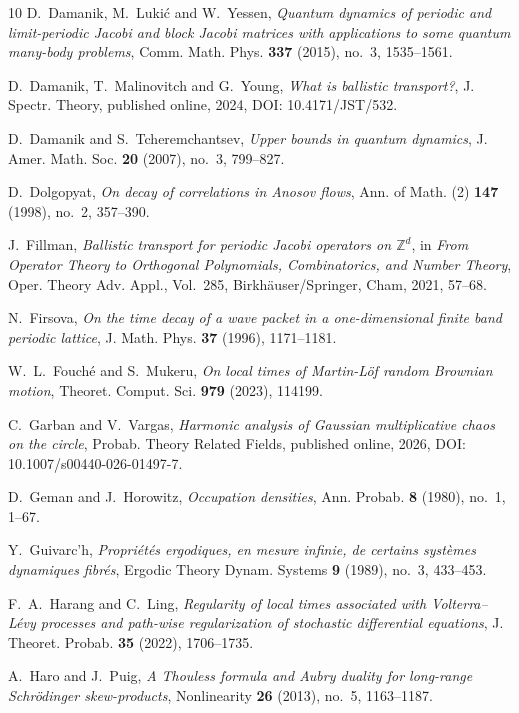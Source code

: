 \documentclass[11pt]{amsart}
\theoremstyle{plain}
\theoremstyle{definition}
\numberwithin{equation}{section}
\begin{document}
\begin{thebibliography}{10}
D.~Damanik, M.~Luki\'c and W.~Yessen,
\emph{Quantum dynamics of periodic and limit-periodic Jacobi and block Jacobi matrices with applications to some quantum many-body problems},
Comm. Math. Phys. \textbf{337} (2015), no.~3, 1535--1561.

D.~Damanik, T.~Malinovitch and G.~Young,
\emph{What is ballistic transport?},
J. Spectr. Theory, published online, 2024,
DOI: 10.4171/JST/532.

D.~Damanik and S.~Tcheremchantsev,
\emph{Upper bounds in quantum dynamics},
J. Amer. Math. Soc. \textbf{20} (2007), no.~3, 799--827.

D.~Dolgopyat,
\emph{On decay of correlations in Anosov flows},
Ann. of Math. (2) \textbf{147} (1998), no.~2, 357--390.

J.~Fillman,
\emph{Ballistic transport for periodic Jacobi operators on $\mathbb Z^d$},
in \emph{From Operator Theory to Orthogonal Polynomials, Combinatorics, and Number Theory},
Oper. Theory Adv. Appl., Vol.~285,
Birkh\"auser/Springer, Cham, 2021, 57--68.

N.~Firsova,
\emph{On the time decay of a wave packet in a one-dimensional finite band periodic lattice},
J. Math. Phys. \textbf{37} (1996), 1171--1181.

W.~L.~Fouch\'e and S.~Mukeru,
\emph{On local times of Martin-L\"of random Brownian motion},
Theoret. Comput. Sci. \textbf{979} (2023), 114199.

C.~Garban and V.~Vargas,
\emph{Harmonic analysis of Gaussian multiplicative chaos on the circle},
Probab. Theory Related Fields, published online, 2026,
DOI: 10.1007/s00440-026-01497-7.

D.~Geman and J.~Horowitz,
\emph{Occupation densities},
Ann. Probab. \textbf{8} (1980), no.~1, 1--67.

Y.~Guivarc'h,
\emph{Propri\'et\'es ergodiques, en mesure infinie, de certains syst\`emes dynamiques fibr\'es},
Ergodic Theory Dynam. Systems \textbf{9} (1989), no.~3, 433--453.

F.~A.~Harang and C.~Ling,
\emph{Regularity of local times associated with Volterra--L\'evy processes
and path-wise regularization of stochastic differential equations},
J. Theoret. Probab. \textbf{35} (2022), 1706--1735.

A.~Haro and J.~Puig,
\emph{A Thouless formula and Aubry duality for long-range Schr\"odinger skew-products},
Nonlinearity \textbf{26} (2013), no.~5, 1163--1187.


\end{thebibliography}
\end{document}
